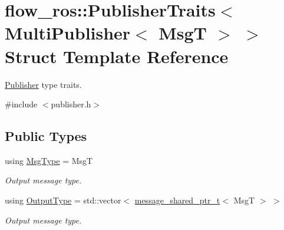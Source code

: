 \hypertarget{structflow__ros_1_1_publisher_traits_3_01_multi_publisher_3_01_msg_t_01_4_01_4}{}\section{flow\+\_\+ros\+:\+:Publisher\+Traits$<$ Multi\+Publisher$<$ MsgT $>$ $>$ Struct Template Reference}
\label{structflow__ros_1_1_publisher_traits_3_01_multi_publisher_3_01_msg_t_01_4_01_4}


\hyperlink{classflow__ros_1_1_publisher}{Publisher} type traits.  




{\ttfamily \#include $<$publisher.\+h$>$}

\subsection*{Public Types}
\begin{DoxyCompactItemize}
\item 
\mbox{\label{structflow__ros_1_1_publisher_traits_3_01_multi_publisher_3_01_msg_t_01_4_01_4_a1efbdbf3c805ccc15e6970bb711f8d13}} 
using \hyperlink{structflow__ros_1_1_publisher_traits_3_01_multi_publisher_3_01_msg_t_01_4_01_4_a1efbdbf3c805ccc15e6970bb711f8d13}{Msg\+Type} = MsgT
\begin{DoxyCompactList}\small\item\em Output message type. \end{DoxyCompactList}\item 
\mbox{\label{structflow__ros_1_1_publisher_traits_3_01_multi_publisher_3_01_msg_t_01_4_01_4_a1a987e04fc7dbaabe0e55432d5ddf86e}} 
using \hyperlink{structflow__ros_1_1_publisher_traits_3_01_multi_publisher_3_01_msg_t_01_4_01_4_a1a987e04fc7dbaabe0e55432d5ddf86e}{Output\+Type} = std\+::vector$<$ \hyperlink{namespaceflow__ros_a21a684f38ee2083b3858613317c46d82}{message\+\_\+shared\+\_\+ptr\+\_\+t}$<$ MsgT $>$ $>$
\begin{DoxyCompactList}\small\item\em Output message type. \end{DoxyCompactList}\end{DoxyCompactItemize}


